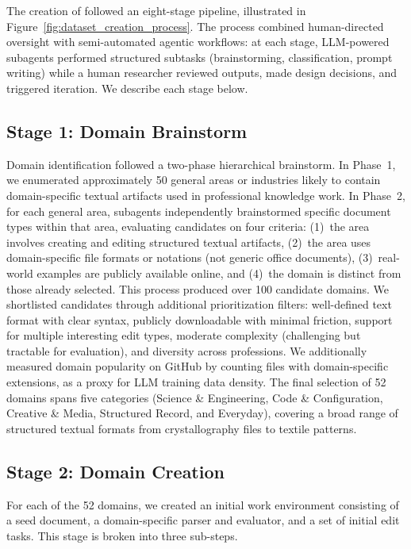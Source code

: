 \documentclass{article} %
\begin{document}
The creation of \benchmark{} followed an eight-stage pipeline, illustrated in Figure~\ref{fig:dataset_creation_process}. The process combined human-directed oversight with semi-automated agentic workflows: at each stage, LLM-powered subagents performed structured subtasks (brainstorming, classification, prompt writing) while a human researcher reviewed outputs, made design decisions, and triggered iteration. We describe each stage below.

\subsection{Stage 1: Domain Brainstorm} \label{app:domain_brainstorm}
Domain identification followed a two-phase hierarchical brainstorm. In Phase~1, we enumerated approximately 50 general areas or industries likely to contain domain-specific textual artifacts used in professional knowledge work. In Phase~2, for each general area, subagents independently brainstormed specific document types within that area, evaluating candidates on four criteria: (1)~the area involves creating and editing structured textual artifacts, (2)~the area uses domain-specific file formats or notations (not generic office documents), (3)~real-world examples are publicly available online, and (4)~the domain is distinct from those already selected. This process produced over 100 candidate domains. We shortlisted candidates through additional prioritization filters: well-defined text format with clear syntax, publicly downloadable with minimal friction, support for multiple interesting edit types, moderate complexity (challenging but tractable for evaluation), and diversity across professions. We additionally measured domain popularity on GitHub by counting files with domain-specific extensions, as a proxy for LLM training data density. The final selection of 52 domains spans five categories (Science \& Engineering, Code \& Configuration, Creative \& Media, Structured Record, and Everyday), covering a broad range of structured textual formats from crystallography files to textile patterns.

\subsection{Stage 2: Domain Creation} \label{app:domain_creation}
For each of the 52 domains, we created an initial work environment consisting of a seed document, a domain-specific parser and evaluator, and a set of initial edit tasks. This stage is broken into three sub-steps.
\end{document}
